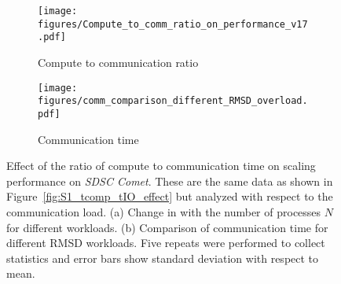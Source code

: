 \begin{figure}[!htb]
  \centering
  \begin{subfigure}{.3\textwidth}
    \texttt{[image: figures/Compute\_to\_comm\_ratio\_on\_performance\_v17.pdf]}
    \captionsetup{format=hang}
    \caption{Compute to communication ratio \Rcompcomm}
    \label{fig:tcomp_tcomm_ratio}
  \end{subfigure}
  \hspace{1em}
  \begin{subfigure}{.33\textwidth}
    \texttt{[image: figures/comm\_comparison\_different\_RMSD\_overload.pdf]}
    \caption{Communication time \tcomm}
    \label{fig:Comm_time_tcomp_tcomm_effect}
  \end{subfigure}
  \caption{Effect of the ratio of compute to communication time \Rcompcomm on scaling performance on \emph{SDSC Comet}.
    These are the same data as shown in Figure~\protect\ref{fig:S1_tcomp_tIO_effect} but analyzed with respect to the communication load.
    (a) Change in \Rcompcomm with the number of processes $N$ for different workloads. 
    (b) Comparison of communication time for different RMSD workloads.
    Five repeats were performed to collect statistics and error bars show standard deviation with respect to mean.}
  \label{fig:tcom_tcomm_effect}
\end{figure}

